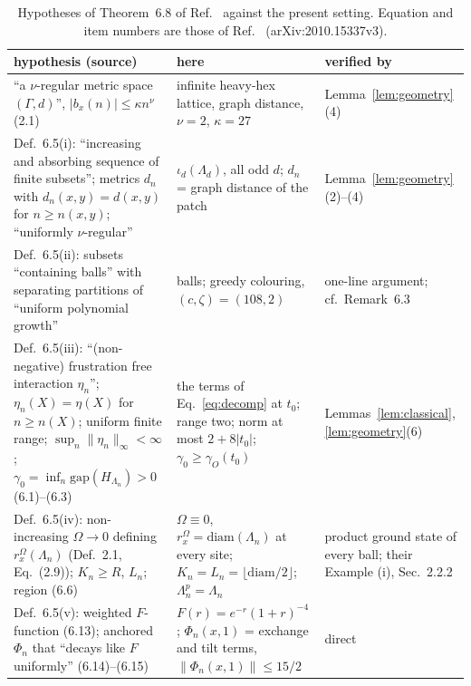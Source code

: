 \documentclass[aps,prx,onecolumn,10pt,nofootinbib,longbibliography,floatfix]{revtex4-2}
\theoremstyle{remark}
\begin{document}
\begin{table}[h]
\caption{Hypotheses of Theorem~6.8 of Ref.~\cite{nsy2022} against the present setting. Equation and item numbers are %
those of Ref.~\cite{nsy2022} (arXiv:2010.15337v3).} %
\label{tab:nsy}
\begin{tabular}{p{}p{}p{}} %
hypothesis (source) & here & verified by\\ \hline
``a $\nu$-regular metric space $(\Gamma,d)$'', $|b_x(n)|\le\kappa n^\nu$ (2.1) & infinite heavy-hex lattice, graph distance, $\nu=2$, $\kappa=27$ & Lemma~\ref{lem:geometry}(4)\\ %
Def.~6.5(i): ``increasing and absorbing sequence of finite subsets''; metrics $d_n$ with $d_n(x,y)=d(x,y)$ for $n\ge n(x,y)$; ``uniformly $\nu$-regular'' & $\iota_d(\Lambda_d)$, all odd $d$; $d_n$ = graph distance of the patch & Lemma~\ref{lem:geometry}(2)--(4)\\ %
Def.~6.5(ii): subsets ``containing balls'' with separating partitions of ``uniform polynomial growth'' & balls; greedy colouring, $(c,\zeta)=(108,2)$ & one-line argument; cf.\ Remark~6.3\\ %
Def.~6.5(iii): ``(non-negative) frustration free interaction $\eta_n$''; $\eta_n(X)=\eta(X)$ for $n\ge n(X)$; uniform finite range; $\sup_n\|\eta_n\|_\infty<\infty$; $\gamma_0=\inf_n\mathrm{gap}(H_{\Lambda_n})>0$ (6.1)--(6.3) & the terms of Eq.~\eqref{eq:decomp} at $t_0$; range two; norm at most $2+8|t_0|$; $\gamma_0\ge\gamma_O(t_0)$ & Lemmas~\ref{lem:classical}, \ref{lem:geometry}(6)\\ %
Def.~6.5(iv): non-increasing $\Omega\to0$ defining $r^\Omega_x(\Lambda_n)$ (Def.~2.1, Eq.~(2.9)); $K_n\ge R$, $L_n$; region (6.6) & $\Omega\equiv0$, $r^\Omega_x=\mathrm{diam}(\Lambda_n)$ at every site; $K_n=L_n=\lfloor\mathrm{diam}/2\rfloor$; $\Lambda^p_n=\Lambda_n$ & product ground state of every ball; their Example (i), Sec.~2.2.2\\ %
Def.~6.5(v): weighted $F$-function (6.13); anchored $\Phi_n$ that ``decays like $F$ uniformly'' (6.14)--(6.15) & $F(r)=e^{-r}(1+r)^{-4}$; $\Phi_n(x,1)$ = exchange and tilt terms, $\|\Phi_n(x,1)\|\le15/2$ & direct\\ %

\end{tabular}
\end{table}
\end{document}

